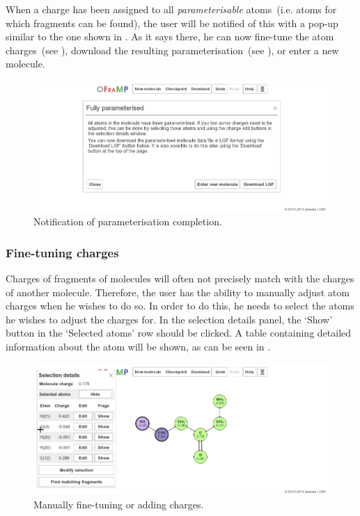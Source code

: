 When a charge has been assigned to all \emph{parameterisable} atoms~(i.e. atoms for which fragments can be found), the user will be notified of this with a pop-up similar to the one shown in . As it says there, he can now fine-tune the atom charges~(see ), download the resulting parameterisation~(see ), or enter a new molecule.

\begin{figure}
\center
\includegraphics[width=.9\textwidth]{img/finished.png}
\caption{Notification of parameterisation completion.}
\end{figure}


\subsubsection{Fine-tuning charges}
Charges of fragments of molecules will often not precisely match with the charges of another molecule. Therefore, the user has the ability to manually adjust atom charges when he wishes to do so. In order to do this, he needs to select the atoms he wishes to adjust the charges for. In the selection details panel, the `Show' button in the `Selected atoms' row should be clicked. A table containing detailed information about the atom will be shown, as can be seen in .

\begin{figure}
\center
\includegraphics[width=.9\textwidth]{img/editing.png}
\caption{Manually fine-tuning or adding charges.}
\end{figure}

